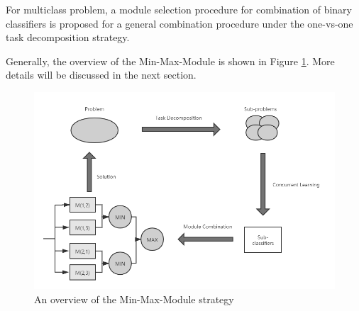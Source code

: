 For multiclass problem, a module selection procedure for combination of binary classifiers is proposed for a general combination procedure under the one-vs-one task decomposition strategy\cite{赵海2005最小最大模块化分类器研究}.


Generally, the overview of the Min-Max-Module is shown in Figure \ref{fig:An overview of the Min-Max-Module strategy}\cite{lu2000emergence}. More details will be discussed in the next section.
\begin{figure}[!ht]
    \centering
    \includegraphics[width=\textwidth]{figures/An overview of the Min-Max-Module strategy.png}
    \caption{An overview of the Min-Max-Module strategy}
    \label{fig:An overview of the Min-Max-Module strategy}
\end{figure}

